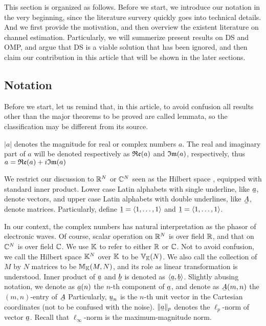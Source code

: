 
This section is organized as follows.
Before we start, we introduce our notation in the very beginning, since the literature survery quickly goes into technical details.
And we first provide the motivation, and then overview the existent literature on channel estimation.
Particularly, we will summerize present results on DS and OMP, and argue that DS is a viable solution that has been ignored, and then claim our contribution in this article that will be shown in the later sections.

\subsection{Notation}

Before we start, let us remind that, in this article, to avoid confusion all results other than the major theorems to be proved are called lemmata, so the classification may be different from its source.

\(|a|\) denotes the magnitude for real or complex numbers \(a\).
The real and imaginary part of \(a\) will be denoted respectively as \(\mathfrak{Re}(a)\) and \(\mathfrak{Im}(a)\), respectively, thus \(a =\mathfrak{Re}(a) + i \mathfrak{Im}(a)\)

We restrict our discussion to \(\mathbb{R}^N\) or \(\mathbb{C}^N\) seen as the Hilbert space , equipped with standard inner product.
Lower case Latin alphabets with single underline, like \(\V{a}\), denote vectors, and upper case Latin alphabets with double underlines, like \(\M{A}\), denote matrices.
Particularly, define \(\V{1} =\IP{ 1, \dotsc, 1 }\) and \(\V{1} =\IP{ 1, \dotsc, 1 }\).

In our context, the complex numbers has natural interpretation as the phasor of electronic waves.
Of course, scalar operation on \(\mathbb{R}^N\) is over field \(\mathbb{R}\), and that on \(\mathbb{C}^N\) is over field \(\mathbb{C}\).
We use \(\mathbb{K}\) to refer to either \(\mathbb{R}\) or \(\mathbb{C}\).
Not to avoid confusion, we call the Hilbert space \(\mathbb{K}^N\) over \(\mathbb{K}\) to be \(\mathbb{V}_{\mathbb{K}} (N)\).
We also call the collection of \(M\) by \(N\) matrices to be \(\mathbb{M}_{\mathbb{K}}(M,N)\), and its role as linear transformation is understood.
Inner product of \(\V{a}\) and \(\V{b}\) is denoted as \(\IP{ \V{a}, \V{b} }\).
Slightly abusing notation, we denote as \(\V{a}(n)\) the \(n\)-th component of \(\V{a}\), and denote as \(\V{A}(m,n)\) the \((m,n)\)-entry of \(\V{A}\)
Particularly, \(\V{u}_n\) is the \(n\)-th unit vector in the Cartesian coordinates (not to be confused with the noise).
\(\|\V{a}\|_p\) denotes the \(\ell_p\)-norm of vector \(\V{a}\).
Recall that \(\ell_\infty\)-norm is the maximum-magnitude norm.

